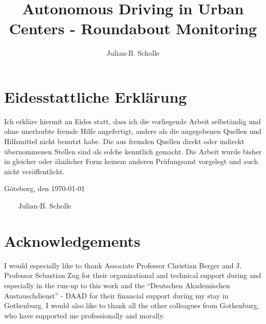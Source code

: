 \documentclass[11pt,oneside,openright]{mpreport}
\title{Autonomous Driving in Urban Centers - Roundabout Monitoring}
\author{Julian-B. Scholle}
\begin{document}
\maketitle



\chapter*{Eidesstattliche Erklärung}
Ich erkläre hiermit an Eides statt, dass ich die vorliegende Arbeit selbständig und
ohne unerlaubte fremde Hilfe angefertigt, andere als die angegebenen Quellen und
Hilfsmittel nicht benutzt habe. Die aus fremden Quellen direkt oder indirekt
übernommenen Stellen sind als solche kenntlich gemacht.
Die Arbeit wurde bisher in gleicher oder ähnlicher Form keinem anderen
Prüfungsamt vorgelegt und auch nicht veröffentlicht.

\noindent Göteborg, den \today
\begin{flushright}
$\overline{~~~~~~~~~\mbox{Julian-B. Scholle}~~~~~~~~~}$
\end{flushright}


\chapter*{Acknowledgements}

I would especially like to thank Associate Professor Christian Berger and J. Professor Sebastian Zug for their organizational and technical support during and especially in the run-up to this work and
the ``Deutschen Akademischen Austauschdienst'' - DAAD for their financial support during my stay in Gothenburg.
I would also like to thank all the other colleagues from Gothenburg, who have supported me professionally and morally.



\tableofcontents
\clearpage 




\end{document}
